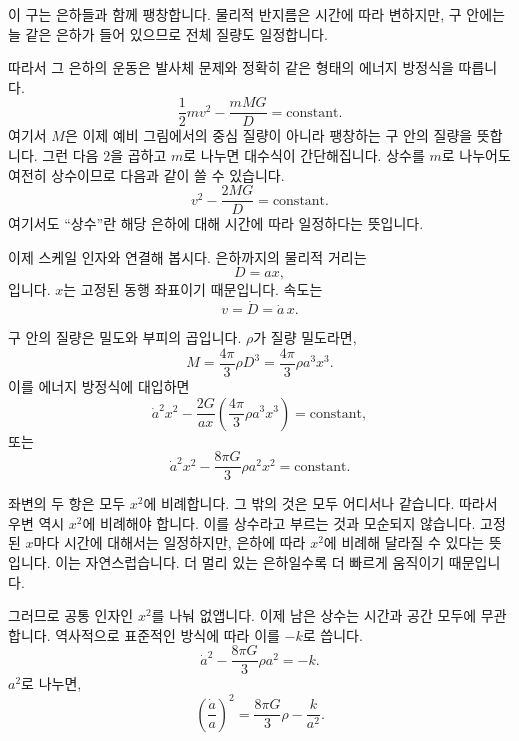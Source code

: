 이 구는 은하들과 함께 팽창합니다. 물리적 반지름은 시간에 따라 변하지만, 구 안에는 늘 같은 은하가 들어 있으므로 전체 질량도 일정합니다.

따라서 그 은하의 운동은 발사체 문제와 정확히 같은 형태의 에너지 방정식을 따릅니다.
\begin{equation}
\frac{1}{2}mv^2-\frac{mMG}{D}=\text{constant}.
\end{equation}
여기서 \(M\)은 이제 예비 그림에서의 중심 질량이 아니라 팽창하는 구 안의 질량을 뜻합니다. 그런 다음 \(2\)을 곱하고 \(m\)로 나누면 대수식이 간단해집니다. 상수를 \(m\)로 나누어도 여전히 상수이므로 다음과 같이 쓸 수 있습니다.
\begin{equation}
v^2-\frac{2MG}{D}=\text{constant}.
\end{equation}
여기서도 ``상수''란 해당 은하에 대해 시간에 따라 일정하다는 뜻입니다.

이제 스케일 인자와 연결해 봅시다. 은하까지의 물리적 거리는
\begin{equation}
D=ax,
\end{equation}
입니다. \(x\)는 고정된 동행 좌표이기 때문입니다. 속도는
\begin{equation}
v=\dot D=\dot a\,x.
\end{equation}

구 안의 질량은 밀도와 부피의 곱입니다. \(\rho\)가 질량 밀도라면,
\begin{equation}
M=\frac{4\pi}{3}\rho D^3=\frac{4\pi}{3}\rho a^3x^3.
\end{equation}
이를 에너지 방정식에 대입하면
\begin{equation}
\dot a^2x^2-\frac{2G}{ax}\left(\frac{4\pi}{3}\rho a^3x^3\right)=\text{constant},
\end{equation}
또는
\begin{equation}
\dot a^2x^2-\frac{8\pi G}{3}\rho a^2x^2=\text{constant}.
\end{equation}

좌변의 두 항은 모두 \(x^2\)에 비례합니다. 그 밖의 것은 모두 어디서나 같습니다. 따라서 우변 역시 \(x^2\)에 비례해야 합니다. 이를 상수라고 부르는 것과 모순되지 않습니다. 고정된 \(x\)마다 시간에 대해서는 일정하지만, 은하에 따라 \(x^2\)에 비례해 달라질 수 있다는 뜻입니다. 이는 자연스럽습니다. 더 멀리 있는 은하일수록 더 빠르게 움직이기 때문입니다.

그러므로 공통 인자인 \(x^2\)를 나눠 없앱니다. 이제 남은 상수는 시간과 공간 모두에 무관합니다. 역사적으로 표준적인 방식에 따라 이를 \(-k\)로 씁니다.
\begin{equation}
\dot a^2-\frac{8\pi G}{3}\rho a^2=-k.
\end{equation}
\(a^2\)로 나누면,
\begin{equation}
\left(\frac{\dot a}{a}\right)^2=\frac{8\pi G}{3}\rho-\frac{k}{a^2}.
\end{equation}

